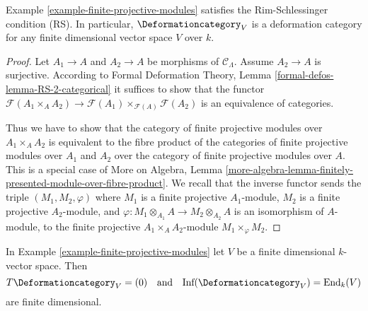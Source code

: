 \begin{lemma}
\label{lemma-finite-projective-modules-RS}
Example \ref{example-finite-projective-modules}
satisfies the Rim-Schlessinger condition (RS).
In particular, $\Deformationcategory_V$ is a deformation category
for any finite dimensional vector space $V$ over $k$.
\end{lemma}

\begin{proof}
Let $A_1 \to A$ and $A_2 \to A$ be morphisms of $\mathcal{C}_\Lambda$.
Assume $A_2 \to A$ is surjective. According to
Formal Deformation Theory, Lemma
\ref{formal-defos-lemma-RS-2-categorical}
it suffices to show that the functor
$\mathcal{F}(A_1 \times_A A_2) \to
\mathcal{F}(A_1) \times_{\mathcal{F}(A)} \mathcal{F}(A_2)$
is an equivalence of categories.

\medskip\noindent
Thus we have to show that the category of finite projective modules
over $A_1 \times_A A_2$ is equivalent to the fibre product
of the categories of finite projective modules over $A_1$ and $A_2$
over the category of finite projective modules over $A$.
This is a special case of More on Algebra, Lemma
\ref{more-algebra-lemma-finitely-presented-module-over-fibre-product}.
We recall that the inverse functor sends the triple
$(M_1, M_2, \varphi)$ where
$M_1$ is a finite projective $A_1$-module,
$M_2$ is a finite projective $A_2$-module, and
$\varphi : M_1 \otimes_{A_1} A \to M_2 \otimes_{A_2} A$
is an isomorphism of $A$-module, to the finite projective
$A_1 \times_A A_2$-module $M_1 \times_\varphi M_2$.
\end{proof}

\begin{lemma}
\label{lemma-finite-projective-modules-TI}
In Example \ref{example-finite-projective-modules}
let $V$ be a finite dimensional $k$-vector space. Then
$$
T\Deformationcategory_V = (0)
\quad\text{and}\quad
\text{Inf}(\Deformationcategory_V) = \text{End}_k(V)
$$
are finite dimensional.
\end{lemma}

